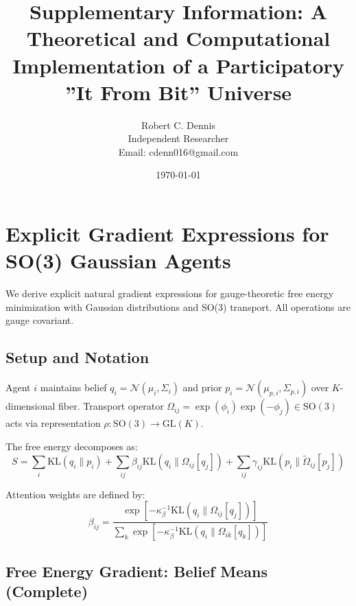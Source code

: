 \documentclass[11pt]{article}
\begin{document}
\title{Supplementary Information: A Theoretical and Computational Implementation of a Participatory ”It From Bit” Universe}

\author{Robert C. Dennis\\
\small Independent Researcher\\
\small Email: cdenn016@gmail.com}

\date{\today}

\maketitle




\section*{Explicit Gradient Expressions for SO(3) Gaussian Agents}

We derive explicit natural gradient expressions for gauge-theoretic free energy minimization with Gaussian distributions and SO(3) transport. All operations are gauge covariant.

\subsection*{Setup and Notation}

Agent $i$ maintains belief $q_i = \mathcal{N}(\mu_i, \Sigma_i)$ and prior $p_i = \mathcal{N}(\mu_{p,i}, \Sigma_{p,i})$ over $K$-dimensional fiber. Transport operator $\Omega_{ij} = \exp(\phi_i)\exp(-\phi_j) \in \mathrm{SO}(3)$ acts via representation $\rho: \mathrm{SO}(3) \to \mathrm{GL}(K)$.

The free energy decomposes as:
\begin{equation}
S = \sum_i \mathrm{KL}(q_i \| p_i) + \sum_{ij} \beta_{ij} \mathrm{KL}(q_i \| \Omega_{ij}[q_j]) + \sum_{ij} \gamma_{ij} \mathrm{KL}(p_i \| \tilde{\Omega}_{ij}[p_j])
\end{equation}

Attention weights are defined by:
\begin{equation}
\beta_{ij} = \frac{\exp\left[-\kappa_\beta^{-1}\mathrm{KL}(q_i \| \Omega_{ij}[q_j])\right]}{\sum_k \exp\left[-\kappa_\beta^{-1}\mathrm{KL}(q_i \| \Omega_{ik}[q_k])\right]}
\end{equation}

\subsection*{Free Energy Gradient: Belief Means (Complete)}
\end{document}
